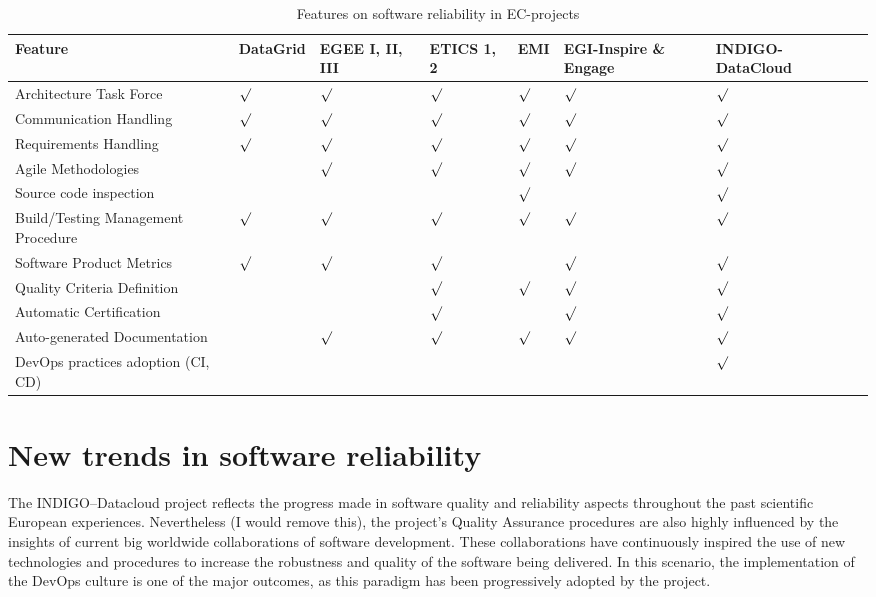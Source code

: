 \documentclass[journal]{IEEEtran}
\begin{document}
\begin{table}[!h]
\renewcommand{\arraystretch}{1.3}
\caption{Features on software reliability in EC-projects}
\label{tab:feat}
\centering
\begin{adjustbox}{max width=0.5\textwidth}
\begin{tabular}{llllllll}
\hline
\hline
Feature & DataGrid & EGEE I, II, III & ETICS 1, 2 & EMI & EGI-Inspire \& Engage & INDIGO-DataCloud\\
\hline
\hline
Architecture Task Force&$\surd$&$\surd$&$\surd$&$\surd$&$\surd$&$\surd$\\
Communication Handling&$\surd$&$\surd$&$\surd$&$\surd$&$\surd$&$\surd$\\
Requirements Handling&$\surd$&$\surd$&$\surd$&$\surd$&$\surd$&$\surd$\\
Agile Methodologies&&$\surd$&$\surd$&$\surd$&$\surd$&$\surd$\\
Source code inspection&&&&$\surd$&&$\surd$\\
Build/Testing Management Procedure&$\surd$&$\surd$&$\surd$&$\surd$&$\surd$&$\surd$\\
Software Product Metrics&$\surd$&$\surd$&$\surd$&&$\surd$&$\surd$\\
Quality Criteria Definition&&&$\surd$&$\surd$&$\surd$&$\surd$\\
Automatic Certification&&&$\surd$&&$\surd$&$\surd$\\
Auto-generated Documentation&&$\surd$&$\surd$&$\surd$&$\surd$&$\surd$\\
DevOps practices adoption (CI, CD)&&&&&&$\surd$\\
\hline
\hline
\end{tabular}
\end{adjustbox}
\end{table}

\section{New trends in software reliability}
\label{sec:ntsr}

The INDIGO--Datacloud project reflects the progress made in software
quality and reliability aspects throughout the past scientific European
experiences. Nevertheless (I would remove this), the project’s Quality Assurance procedures are also
highly influenced by the insights of current big worldwide collaborations of
software development. These collaborations have continuously inspired the use of new
technologies and procedures to increase the robustness and quality of the
software being delivered. In this scenario, the implementation of the DevOps culture 
is one of the major outcomes, as this paradigm has been progressively adopted by the
project.
\end{document}
